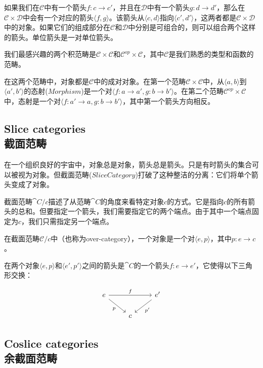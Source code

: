 \documentclass[DaoFP]{subfiles}
\begin{document}
    如果我们在$\mathcal{C}$中有一个箭头$f \colon c \to c'$，并且在$\mathcal{D}$中有一个箭头$g \colon d \to d'$，那么在$\mathcal{C} \times \mathcal{D}$中会有一个对应的箭头$\langle f, g \rangle$。该箭头从$\langle c, d \rangle $指向$\langle c', d' \rangle $，这两者都是$\mathcal{C} \times \mathcal{D}$中的对象。如果它们的组成部分在$\mathcal{C}$和$\mathcal{D}$中分别是可组合的，则可以组合两个这样的箭头。单位箭头是一对单位箭头。

    我们最感兴趣的两个积范畴是$\mathcal{C} \times \mathcal{C}$和$\mathcal{C}^{op} \times \mathcal{C}$，其中$\mathcal{C}$是我们熟悉的类型和函数的范畴。

    在这两个范畴中，对象都是$\mathcal{C}$中的成对对象。在第一个范畴$\mathcal{C} \times \mathcal{C}$中，从$\langle a, b \rangle $到$\langle a', b' \rangle $的态射($Morphism$)是一个对$\langle f \colon a \to a', g \colon b \to b' \rangle $。在第二个范畴$\mathcal{C}^{op} \times \mathcal{C}$中，态射是一个对$\langle f \colon a' \to a, g \colon b \to b' \rangle $，其中第一个箭头方向相反。

    \subsection{Slice categories\\截面范畴}

    在一个组织良好的宇宙中，对象总是对象，箭头总是箭头。只是有时箭头的集合可以被视为对象。但截面范畴($Slice Category$)打破了这种整洁的分离：它们将单个箭头变成了对象。

    截面范畴$\cat C/c$描述了从范畴$\cat C$的角度来看特定对象$c$的方式。它是指向$c$的所有箭头的总和。但要指定一个箭头，我们需要指定它的两个端点。由于其中一个端点固定为$c$，我们只需指定另一个端点。

    在截面范畴$\mathcal{C}/c$中（也称为over-category），一个对象是一个对$\langle e, p \rangle$，其中$p \colon e \to c$。

    在两个对象$\langle e, p \rangle$和$\langle e', p' \rangle$之间的箭头是$\cat C$的一个箭头$f \colon e \to e'$，它使得以下三角形交换：

    \[
        \begin{tikzcd}
            e
            \arrow[rd, "p"']
            \arrow[rr, "f"]
            && e'
            \arrow[ld, "p'"]
            \\
            &c
        \end{tikzcd}
    \]

    \subsection{Coslice categories\\余截面范畴}
\end{document}
